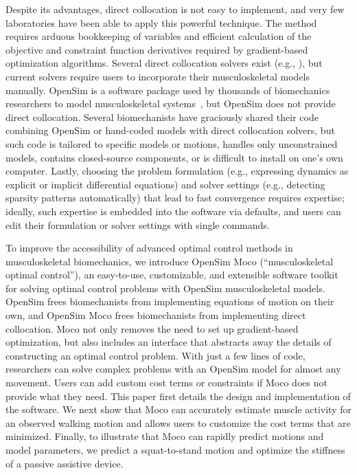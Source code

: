 \documentclass[10pt,letterpaper]{article}
\begin{document}
Despite its advantages, direct collocation is not easy to implement, and very few laboratories have been able to apply this powerful technique. The method requires arduous bookkeeping of variables and efficient calculation of the objective and constraint function derivatives required by gradient-based optimization algorithms. Several direct collocation solvers exist (e.g., \cite{Becerra:2010,Patterson:2014}), but current solvers require users to incorporate their musculoskeletal models manually. OpenSim is a software package used by thousands of biomechanics researchers to model musculoskeletal systems~\cite{Delp:2007ij,Seth:2018gg,Sherman:2011byc}, but OpenSim does not provide direct collocation. Several biomechanists have graciously shared their code combining OpenSim or hand-coded models with direct collocation solvers, but such code is tailored to specific models or motions, handles only unconstrained models, contains closed-source components, or is difficult to install on one's own computer. Lastly, choosing the problem formulation (e.g., expressing dynamics as explicit or implicit differential equations) and solver settings (e.g., detecting sparsity patterns automatically) that lead to fast convergence requires expertise; ideally, such expertise is embedded into the software via defaults, and users can edit their formulation or solver settings with single commands.

To improve the accessibility of advanced optimal control methods in musculoskeletal biomechanics, we introduce OpenSim Moco (``musculoskeletal optimal control''), an easy-to-use, customizable, and extensible software toolkit for solving optimal control problems with OpenSim musculoskeletal models. OpenSim frees biomechanists from implementing equations of motion on their own, and OpenSim Moco frees biomechanists from implementing direct collocation. Moco not only removes the need to set up gradient-based optimization, but also includes an interface that abstracts away the details of constructing an optimal control problem. With just a few lines of code, researchers can solve complex problems with an OpenSim model for almost any movement. Users can add custom cost terms or constraints if Moco does not provide what they need. This paper first details the design and implementation of the software. We next show that Moco can accurately estimate muscle activity for an observed walking motion and allows users to customize the cost terms that are minimized. Finally, to illustrate that Moco can rapidly predict motions and model parameters, we predict a squat-to-stand motion and optimize the stiffness of a passive assistive device.
\end{document}
